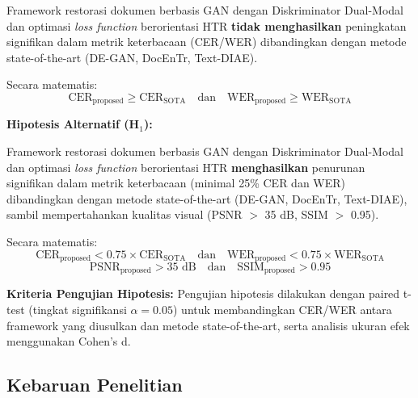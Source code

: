 \documentclass[12pt,a4paper]{article}
\begin{document}
Framework restorasi dokumen berbasis GAN dengan Diskriminator Dual-Modal dan optimasi \textit{loss function} berorientasi HTR \textbf{tidak menghasilkan} peningkatan signifikan dalam metrik keterbacaan (CER/WER) dibandingkan dengan metode state-of-the-art (DE-GAN, DocEnTr, Text-DIAE).

Secara matematis:
\begin{equation}
    \text{CER}_{\text{proposed}} \geq \text{CER}_{\text{SOTA}} \quad \text{dan} \quad \text{WER}_{\text{proposed}} \geq \text{WER}_{\text{SOTA}}
\end{equation}

\vspace{0.5em}
\textbf{Hipotesis Alternatif (H$_1$):}

Framework restorasi dokumen berbasis GAN dengan Diskriminator Dual-Modal dan optimasi \textit{loss function} berorientasi HTR \textbf{menghasilkan} penurunan signifikan dalam metrik keterbacaan (minimal 25\% CER dan WER) dibandingkan dengan metode state-of-the-art (DE-GAN, DocEnTr, Text-DIAE), sambil mempertahankan kualitas visual (PSNR $>$ 35 dB, SSIM $>$ 0.95).

Secara matematis:
\begin{equation}
    \text{CER}_{\text{proposed}} < 0.75 \times \text{CER}_{\text{SOTA}} \quad \text{dan} \quad \text{WER}_{\text{proposed}} < 0.75 \times \text{WER}_{\text{SOTA}}
\end{equation}
\begin{equation}
    \text{PSNR}_{\text{proposed}} > 35 \text{ dB} \quad \text{dan} \quad \text{SSIM}_{\text{proposed}} > 0.95
\end{equation}

\vspace{0.5em}
\textbf{Kriteria Pengujian Hipotesis:}
Pengujian hipotesis dilakukan dengan paired t-test (tingkat signifikansi $\alpha = 0.05$) untuk membandingkan CER/WER antara framework yang diusulkan dan metode state-of-the-art, serta analisis ukuran efek menggunakan Cohen's d.

\vspace{0.8em}
\subsection{Kebaruan Penelitian}
\label{subsec:kebaruan}
\end{document}

